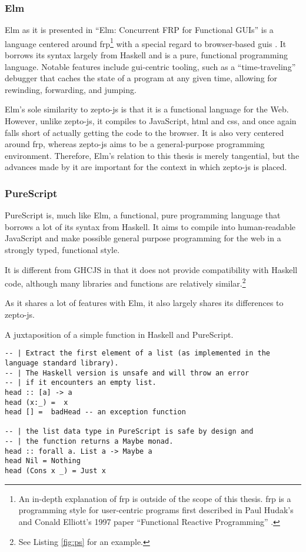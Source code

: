 \documentclass[oneside,11pt,xetex]{scrbook}
\begin{document}
\subsubsection{Elm}

Elm as it is presented in ``Elm: Concurrent FRP for Functional GUIs''
is a language centered around \gls{frp}\footnote{An in-depth
explanation of \gls{frp} is outside of the scope of this thesis.
\gls{frp} is a programming style for user-centric programs first described
in Paul Hudak's and Conald Elliott's 1997 paper ``Functional Reactive
Programming'' \parencite{FRP}.} with a special regard to browser-based
\glspl{gui} \parencite{CPL}. It borrows its syntax largely from Haskell
and is a pure, functional programming language. Notable features include
\gls{gui}-centric tooling, such as a ``time-traveling'' debugger that caches
the state of a program at any given time, allowing for rewinding, forwarding,
and jumping.

Elm's sole similarity to zepto-js is that it is a functional language for the Web.
However, unlike zepto-js, it compiles to JavaScript, \gls{html} and \gls{css}, and
once again falls short of actually getting the code to the browser. It is also very
centered around \gls{frp}, whereas zepto-js aims to be a general-purpose programming
environment. Therefore, Elm's relation to this thesis is merely tangential, but the
advances made by it are important for the context in which zepto-js is placed.

\subsubsection{PureScript}

PureScript is, much like Elm, a functional, pure programming language
that borrows a lot of its syntax from Haskell. It aims to compile into
human-readable JavaScript and make possible general purpose programming
for the web in a strongly typed, functional style.

It is different from GHCJS in that it does not provide compatibility
with Haskell code, although many libraries and functions are relatively
similar.\footnote{See Listing \ref{fig:ps} for an example.}

As it shares a lot of features with Elm, it also largely shares its
differences to zepto-js.

\begin{listing}[H]
\caption{A juxtaposition of a simple function in Haskell and PureScript.}
\begin{verbatim}
-- | Extract the first element of a list (as implemented in the language standard library).
-- | The Haskell version is unsafe and will throw an error
-- | if it encounters an empty list.
head :: [a] -> a
head (x:_) =  x
head [] =  badHead -- an exception function

-- | the list data type in PureScript is safe by design and
-- | the function returns a Maybe monad.
head :: forall a. List a -> Maybe a
head Nil = Nothing
head (Cons x _) = Just x
\end{verbatim}
\label{fig:ps}
\end{listing}
\end{document}
